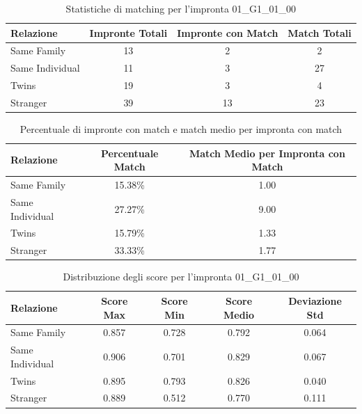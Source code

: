 \begin{table}[htbp]
\centering
\caption{Statistiche di matching per l'impronta 01\_G1\_01\_00}
\label{tab:results_01_G1_01_00}
\begin{tabular}{|l|c|c|c|}
\hline
\textbf{Relazione} & \textbf{Impronte Totali} & \textbf{Impronte con Match} & \textbf{Match Totali} \\
\hline
Same Family & 13 & 2 & 2 \\
\hline
Same Individual & 11 & 3 & 27 \\
\hline
Twins & 19 & 3 & 4 \\
\hline
Stranger & 39 & 13 & 23 \\
\hline
\end{tabular}
\end{table}


\begin{table}[htbp]
\centering
\caption{Percentuale di impronte con match e match medio per impronta con match}
\label{tab:match_percentage_01_G1_01_00}
\begin{tabular}{|l|c|c|}
\hline
\textbf{Relazione} & \textbf{Percentuale Match} & \textbf{Match Medio per Impronta con Match} \\
\hline
Same Family & 15.38\% & 1.00 \\
\hline
Same Individual & 27.27\% & 9.00 \\
\hline
Twins & 15.79\% & 1.33 \\
\hline
Stranger & 33.33\% & 1.77 \\
\hline
\end{tabular}
\end{table}


\begin{table}[htbp]
\centering
\caption{Distribuzione degli score per l'impronta 01\_G1\_01\_00}
\label{tab:scores_01_G1_01_00}
\begin{tabular}{|l|c|c|c|c|}
\hline
\textbf{Relazione} & \textbf{Score Max} & \textbf{Score Min} & \textbf{Score Medio} & \textbf{Deviazione Std} \\
\hline
Same Family & 0.857 & 0.728 & 0.792 & 0.064 \\
\hline
Same Individual & 0.906 & 0.701 & 0.829 & 0.067 \\
\hline
Twins & 0.895 & 0.793 & 0.826 & 0.040 \\
\hline
Stranger & 0.889 & 0.512 & 0.770 & 0.111 \\
\hline
\end{tabular}
\end{table}

